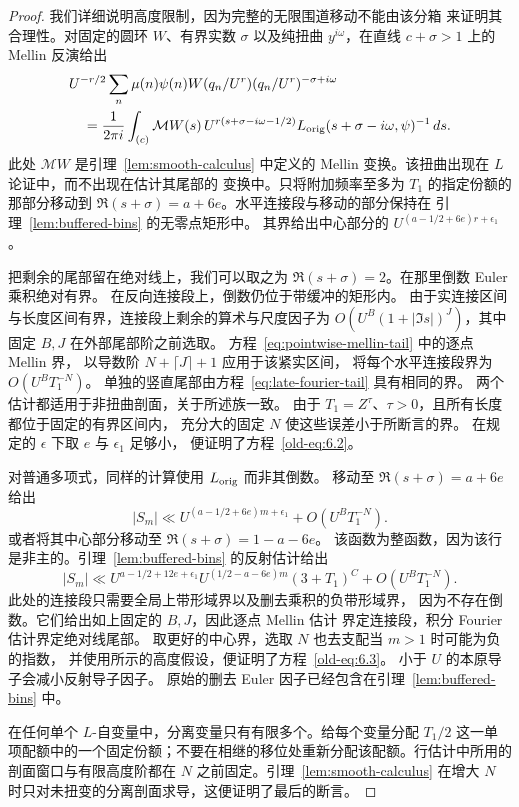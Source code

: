 \documentclass[11pt,a4paper]{article}
\numberwithin{equation}{section}
\numberwithin{figure}{section}
\theoremstyle{definition}
\theoremstyle{remark}
\begin{document}
\begin{proof}
我们详细说明高度限制，因为完整的无限围道移动不能由该分箱
来证明其合理性。对固定的圆环 \(W\)、有界实数 \(\sigma\)
以及纯扭曲 \(y^{i\omega}\)，在直线 \(c+\sigma>1\) 上的 Mellin 反演给出
\[
 \begin{split}
 &U^{-r/2}\sum_n\mu(n)\psi(n)
       W(q_n/U^r)(q_n/U^r)^{-\sigma+i\omega}\\
 &\quad=\frac1{2\pi i}\int_{(c)}
  \mathcal MW(s)\,
  U^{r(s+\sigma-i\omega-1/2)}
  L_{\rm orig}(s+\sigma-i\omega,\psi)^{-1}\,ds.
 \end{split}
\]
此处 \(\mathcal MW\) 是引理~\ref{lem:smooth-calculus} 中定义的
Mellin 变换。该扭曲出现在 \(L\) 论证中，而不出现在估计其尾部的
变换中。只将附加频率至多为 \(T_1\) 的指定份额的那部分移动到
\(\Re(s+\sigma)=a+6e\)。水平连接段与移动的部分保持在
引理~\ref{lem:buffered-bins} 的无零点矩形中。
其界给出中心部分的 \(U^{(a-1/2+6e)r+\epsilon_1}\)。

把剩余的尾部留在绝对线上，我们可以取之为
\(\Re(s+\sigma)=2\)。在那里倒数 Euler 乘积绝对有界。
在反向连接段上，倒数仍位于带缓冲的矩形内。
由于实连接区间与长度区间有界，连接段上剩余的算术与尺度因子为
\(O(U^B(1+|\Im s|)^J)\)，其中固定 \(B,J\) 在外部尾部阶之前选取。
方程~\eqref{eq:pointwise-mellin-tail} 中的逐点 Mellin 界，
以导数阶 \(N+\lceil J\rceil+1\) 应用于该紧实区间，
将每个水平连接段界为 \(O(U^B T_1^{-N})\)。
单独的竖直尾部由方程~\eqref{eq:late-fourier-tail} 具有相同的界。
两个估计都适用于非扭曲剖面，关于所述族一致。
由于 \(T_1=Z^\tau\)、\(\tau>0\)，且所有长度都位于固定的有界区间内，
充分大的固定 \(N\) 使这些误差小于所断言的界。
在规定的 \(\epsilon\) 下取 \(e\) 与 \(\epsilon_1\) 足够小，
便证明了方程~\eqref{old-eq:6.2}。

对普通多项式，同样的计算使用 \(L_{\rm orig}\) 而非其倒数。
移动至 \(\Re(s+\sigma)=a+6e\) 给出
\[
 |S_m|\ll U^{(a-1/2+6e)m+\epsilon_1}
          +O(U^B T_1^{-N}).
\]
或者将其中心部分移动至 \(\Re(s+\sigma)=1-a-6e\)。
该函数为整函数，因为该行是非主的。引理~\ref{lem:buffered-bins}
的反射估计给出
\[
 |S_m|\ll
 U^{a-1/2+12e+\epsilon_1}
 U^{(1/2-a-6e)m}(3+T_1)^C
 +O(U^B T_1^{-N}).
\]
此处的连接段只需要全局上带形域界以及删去乘积的负带形域界，
因为不存在倒数。它们给出如上固定的 \(B,J\)，因此逐点 Mellin 估计
界定连接段，积分 Fourier 估计界定绝对线尾部。
取更好的中心界，选取 \(N\) 也去支配当 \(m>1\) 时可能为负的指数，
并使用所示的高度假设，便证明了方程~\eqref{old-eq:6.3}。
小于 \(U\) 的本原导子会减小反射导子因子。
原始的删去 Euler 因子已经包含在引理~\ref{lem:buffered-bins} 中。

在任何单个 \(L\)-自变量中，分离变量只有有限多个。给每个变量分配 \(T_1/2\) 这一单项配额中的一个固定份额；不要在相继的移位处重新分配该配额。行估计中所用的剖面窗口与有限高度阶都在 \(N\) 之前固定。引理~\ref{lem:smooth-calculus} 在增大 \(N\) 时只对未扭变的分离剖面求导，这便证明了最后的断言。
\end{proof}
\end{document}
